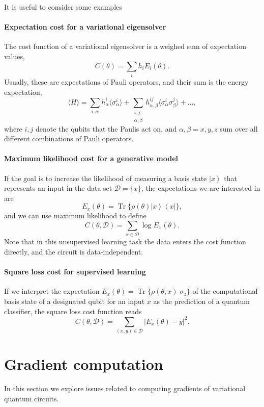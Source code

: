 \documentclass[aps,pra,10pt,twocolumn,groupedaddress,nofootinbib]{revtex4-1}
\theoremstyle{plain}
\DeclareMathOperator{\tr}{Tr}
\newcommand{\be}{\begin{equation}}
\newcommand{\ee}{\end{equation}}
\newcommand{\ket}[1]{\ensuremath{\left| #1 \right \rangle}}
\newcommand{\bra}[1]{\ensuremath{\left \langle #1 \right |}}
\newcommand{\ketbra}[2]{\ket{#1}\bra{#2}}
\begin{document}
It is useful to consider some examples
\paragraph{Expectation cost for a variational eigensolver}

The cost function of a variational eigensolver is a weighed sum of expectation values,
\[ C(\theta) = \sum_i h_i E_i(\theta). \]
Usually, these are expectations of Pauli operators, and their sum is the energy expectation,
\[\langle H \rangle = \sum\limits_{i, \alpha} h^i_{\alpha} \langle\sigma^i_{\alpha}\rangle + \sum\limits_{\substack{i,j\\ \alpha, \beta}} h^{ij}_{\alpha, \beta} \langle \sigma^i_{\alpha}\sigma^j_{\beta}\rangle + \hdots,\]
where $i,j$ denote the qubits that the Paulis act on, and
$\alpha, \beta = x,y,z$ sum over all different combinations of Pauli operators.

\paragraph{Maximum likelihood cost for a generative model}
If the goal is to increase the likelihood of measuring a basis state
$\ket{x}$ that represents an input in the data set
$\mathcal{D} = \{x\}$, the expectations we are interested in are
\be
E_x(\theta) =  \tr\{\rho(\theta) \ketbra{x}{x}  \},
\ee
and we can use maximum likelihood to define
\[C(\theta, \mathcal{D}) = \sum_{x \in \mathcal{D}}\log E_x(\theta) .\]
Note that in this unsupervised learning task the data enters the cost function directly, and the circuit is data-independent.


\paragraph{Square loss cost for supervised learning}
If we interpret the expectation $E_x(\theta) = \tr \{ \rho(\theta, x)
\; \sigma_z \}$ of the computational basis state of a designated qubit
for an input $x$ as the prediction of a quantum classifier, the square
loss cost function reads
\[ C(\theta, \mathcal{D}) = \sum_{(x,y) \in \mathcal{D}} |E_x(\theta)-y|^2. \]

\color{black}


\section{Gradient computation}

In this section we explore issues related to computing gradients of variational quantum circuits.
\end{document}
